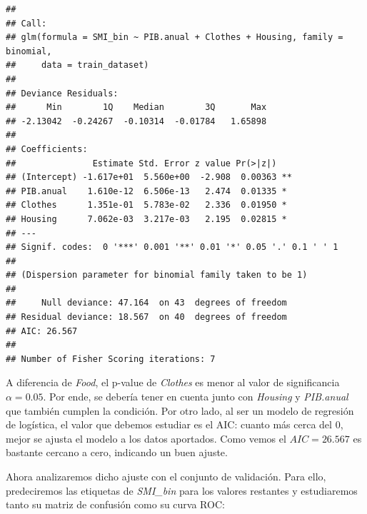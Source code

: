 \documentclass[
]{article}
\begin{document}
\begin{verbatim}
## 
## Call:
## glm(formula = SMI_bin ~ PIB.anual + Clothes + Housing, family = binomial, 
##     data = train_dataset)
## 
## Deviance Residuals: 
##      Min        1Q    Median        3Q       Max  
## -2.13042  -0.24267  -0.10314  -0.01784   1.65898  
## 
## Coefficients:
##               Estimate Std. Error z value Pr(>|z|)   
## (Intercept) -1.617e+01  5.560e+00  -2.908  0.00363 **
## PIB.anual    1.610e-12  6.506e-13   2.474  0.01335 * 
## Clothes      1.351e-01  5.783e-02   2.336  0.01950 * 
## Housing      7.062e-03  3.217e-03   2.195  0.02815 * 
## ---
## Signif. codes:  0 '***' 0.001 '**' 0.01 '*' 0.05 '.' 0.1 ' ' 1
## 
## (Dispersion parameter for binomial family taken to be 1)
## 
##     Null deviance: 47.164  on 43  degrees of freedom
## Residual deviance: 18.567  on 40  degrees of freedom
## AIC: 26.567
## 
## Number of Fisher Scoring iterations: 7
\end{verbatim}

A diferencia de \emph{Food}, el p-value de \emph{Clothes} es menor al
valor de significancia \(\alpha=0.05\). Por ende, se debería tener en
cuenta junto con \emph{Housing} y \emph{PIB.anual} que también cumplen
la condición. Por otro lado, al ser un modelo de regresión de logística,
el valor que debemos estudiar es el AIC: cuanto más cerca del 0, mejor
se ajusta el modelo a los datos aportados. Como vemos el \(AIC=26.567\)
es bastante cercano a cero, indicando un buen ajuste.

Ahora analizaremos dicho ajuste con el conjunto de validación. Para
ello, predeciremos las etiquetas de \emph{SMI\_bin} para los valores
restantes y estudiaremos tanto su matriz de confusión como su curva ROC:
\end{document}
